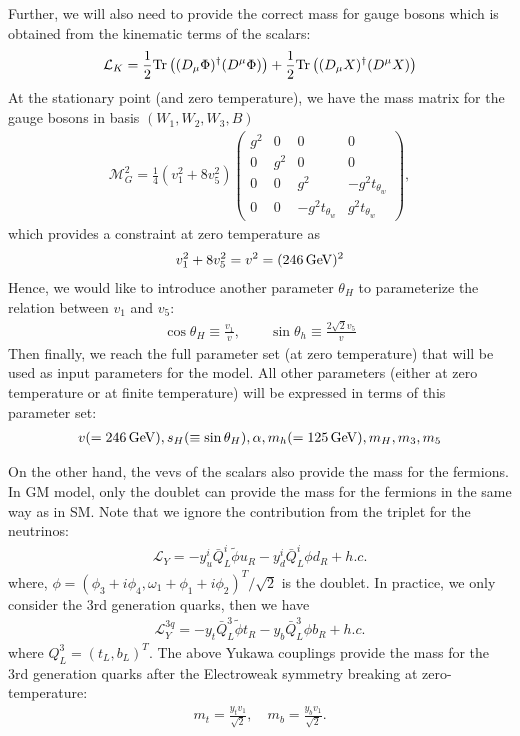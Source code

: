 \documentclass[12pt]{article}
\begin{document}
Further, we will also need to provide the correct mass for gauge bosons which is obtained from the kinematic terms of the scalars:
\begin{align}
\mathcal{L}_K = \frac{1}{2}{\rm Tr}\left((D_\mu\Phi)^\dagger(D^\mu\Phi)\right) + \frac{1}{2}{\rm Tr}\left((D_\mu X)^\dagger (D^\mu X)\right)
\end{align}
At the stationary point (and zero temperature), we have the mass matrix for the gauge bosons in basis $(W_1,W_2,W_3,B)$
\begin{align}
    \mathcal{M}_G^2 = \frac{1}{4}(v_1^2+8v_5^2)\begin{pmatrix}
        g^2 & 0 & 0 & 0 \\
        0 & g^2 & 0 & 0 \\
        0 & 0 & g^2 & -g^2t_{\theta_w} \\
        0 & 0 & -g^2t_{\theta_w} & g^2t_{\theta_w}
    \end{pmatrix},
\end{align}
which provides a constraint at zero temperature as
\begin{align}
    v_1^2 + 8v_5^2 = v^2 = (246\,{\rm GeV})^2
\end{align}
Hence, we would like to introduce another parameter $\theta_H$ to parameterize the relation between $v_1$ and $v_5$:
\begin{align}
    \cos\theta_H \equiv \frac{v_1}{v},\qquad  \sin\theta_h \equiv \frac{2\sqrt{2}v_5}{v}
\end{align}
Then finally, we reach the full parameter set (at zero temperature) that will be used as input parameters for the model. All other parameters (either at zero temperature or at finite temperature) will be expressed in terms of this parameter set:
\begin{align}
    v(=246\,{\rm GeV}), s_H(\equiv \sin\theta_H), \alpha, m_h(=125\,{\rm GeV}), m_H, m_3, m_5
\end{align}

On the other hand, the vevs of the scalars also provide the mass for the fermions. In GM model, only the doublet can provide the mass for the fermions in the same way as in SM. Note that we ignore the contribution from the triplet for the neutrinos:
\begin{align}
    \mathcal{L}_Y = -y_u^i \bar{Q}_L^i\tilde{\phi}u_R - y_d^i \bar{Q}_L^i\phi d_R + h.c.
\end{align}
where, $\phi = (\phi_3+i\phi_4, \omega_1+\phi_1+i\phi_2)^T/\sqrt{2}$ is the doublet. In practice, we only consider the 3rd generation quarks, then we have
\begin{align}
    \mathcal{L}_Y^{3q} = -y_t \bar{Q}_L^3\tilde{\phi}t_R - y_b \bar{Q}_L^3 \phi b_R +h.c.
\end{align}
where $Q_L^3 = (t_L, b_L)^T$. The above Yukawa couplings provide the mass for the 3rd generation quarks after the Electroweak symmetry breaking at zero-temperature:
\begin{align}
    m_t = \frac{y_tv_1}{\sqrt{2}},\quad m_b = \frac{y_bv_1}{\sqrt{2}}.
\end{align}
\end{document}
